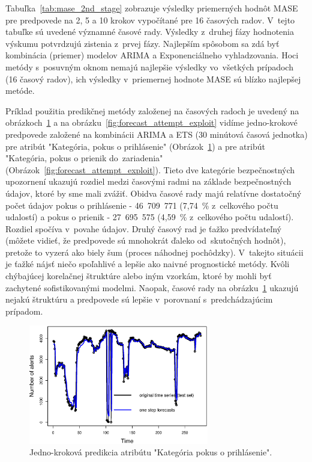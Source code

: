 \documentclass[thesismargins, thesislinespacing, openright, upjsfrontpage]{rnthesis}
\begin{document}
Tabuľka~\ref{tab:mase_2nd_stage} zobrazuje výsledky priemerných hodnôt MASE pre predpovede na 2, 5 a 10 krokov vypočítané pre 16 časových radov. V~tejto tabuľke sú uvedené významné časové rady. Výsledky z~druhej fázy hodnotenia výskumu potvrdzujú zistenia z~prvej fázy. Najlepším spôsobom sa zdá byť kombinácia (priemer) modelov ARIMA a Exponenciálneho vyhladzovania. Hoci metódy s~posuvným oknom nemajú najlepšie výsledky vo~všetkých prípadoch (16 časový radov), ich výsledky v~priemernej hodnote MASE sú blízko najlepšej metóde.

Príklad použitia predikčnej metódy založenej na časových radoch je uvedený na obrázkoch~\ref{fig:forecast_attempt_login} a na obrázku~\ref{fig:forecast_attempt_exploit} vidíme jedno-krokové predpovede založené na kombinácii ARIMA a ETS (30 minútová časová jednotka) pre atribút "Kategória, pokus o prihlásenie" (Obrázok~\ref{fig:forecast_attempt_login}) a pre atribút "Kategória, pokus o prienik do~zariadenia" (Obrázok~\ref{fig:forecast_attempt_exploit}). Tieto dve kategórie bezpečnostných upozornení ukazujú rozdiel medzi časovými radmi na základe bezpečnostných údajov, ktoré by sme mali zvážiť. Obidva časové rady majú relatívne dostatočný počet údajov pokus o prihlásenie - 46~709~771 (7,74~\% z~celkového počtu udalostí) a pokus o prienik - 27~695~575 (4,59~\% z~celkového počtu udalostí). Rozdiel spočíva v~povahe údajov. Druhý časový rad je ťažko predvídateľný~\cite{hendry1995dynamic} (môžete vidieť, že predpovede sú mnohokrát ďaleko od~skutočných hodnôt), pretože to vyzerá ako biely šum (proces náhodnej pochôdzky). V~takejto situácii je ťažké nájsť niečo spoľahlivé a lepšie ako naivné prognostické metódy. Kvôli chýbajúcej korelačnej štruktúre alebo iným vzorkám, ktoré by mohli byť zachytené sofistikovanými modelmi. Naopak, časové rady na obrázku~\ref{fig:forecast_attempt_login} ukazujú nejakú štruktúru a predpovede sú lepšie v~porovnaní s~predchádzajúcim prípadom.

\begin{figure}[h]
  \centering
  \includegraphics[width=0.7\textwidth]{images/item61_1step_forecasts_new.eps}
  \caption{Jedno-kroková predikcia atribútu "Kategória pokus o prihlásenie".} 
  \label{fig:forecast_attempt_login}
\end{figure}
\end{document}
